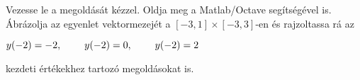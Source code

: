 Vezesse le a 
\de{} megoldását kézzel.
Oldja meg a Matlab/Octave   segítségével is. 
Ábrázolja az egyenlet vektormezejét a $[-3,1]\times [-3,3]$-en és 
rajzoltassa rá az 
\centerline{$y(-2)=-2, \hspace{0.8cm} y(-2)=0, \hspace{0.8cm} y(-2)=2$} 
kezdeti értékekhez tartozó megoldásokat is.


